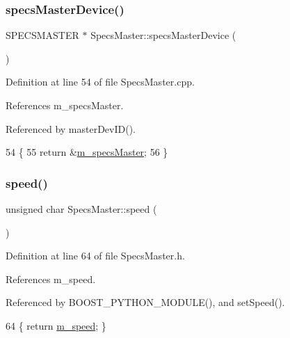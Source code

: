 \subsubsection{\texorpdfstring{specs\+Master\+Device()}{specsMasterDevice()}}
{\footnotesize\ttfamily S\+P\+E\+C\+S\+M\+A\+S\+T\+ER $\ast$ Specs\+Master\+::specs\+Master\+Device (\begin{DoxyParamCaption}{ }\end{DoxyParamCaption})}



Definition at line 54 of file Specs\+Master.\+cpp.



References m\+\_\+specs\+Master.



Referenced by master\+Dev\+I\+D().


\begin{DoxyCode}
54                                             \{
55   \textcolor{keywordflow}{return} &\hyperlink{classSpecsMaster_a32497dbb9887b6c546113135f3acc6b1}{m\_specsMaster};
56 \}
\end{DoxyCode}
\mbox{\label{classSpecsMaster_ad50f852711a25ab247b6bc0603db498d}} 
\subsubsection{\texorpdfstring{speed()}{speed()}}
{\footnotesize\ttfamily unsigned char Specs\+Master\+::speed (\begin{DoxyParamCaption}{ }\end{DoxyParamCaption})\hspace{0.3cm}{\ttfamily [inline]}}



Definition at line 64 of file Specs\+Master.\+h.



References m\+\_\+speed.



Referenced by B\+O\+O\+S\+T\+\_\+\+P\+Y\+T\+H\+O\+N\+\_\+\+M\+O\+D\+U\+L\+E(), and set\+Speed().


\begin{DoxyCode}
64 \{ \textcolor{keywordflow}{return} \hyperlink{classSpecsMaster_af75996281787299ccd92555512802814}{m\_speed}; \}
\end{DoxyCode}
\mbox{\label{classSpecsMaster_abf060966e8205396e326dbbe6cfcc9e8}} 
